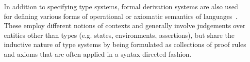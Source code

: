 In addition to specifying type systems, formal derivation systems are
also used for defining various forms of operational or axiomatic
semantics of languages~\cite{Hoare69,Plotkin1981}. These employ different notions of contexts and
generally involve judgements over entities other than types
(e.g. states, environments, assertions), but share the inductive
nature of type systems by being formulated as collections of proof
rules and axioms that are often applied in a syntax-directed fashion.

%
%
